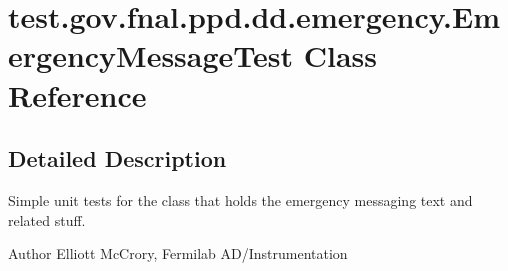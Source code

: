 \hypertarget{classtest_1_1gov_1_1fnal_1_1ppd_1_1dd_1_1emergency_1_1EmergencyMessageTest}{\section{test.\-gov.\-fnal.\-ppd.\-dd.\-emergency.\-Emergency\-Message\-Test Class Reference}
\label{classtest_1_1gov_1_1fnal_1_1ppd_1_1dd_1_1emergency_1_1EmergencyMessageTest}
}


\subsection{Detailed Description}
Simple unit tests for the class that holds the emergency messaging text and related stuff.

\begin{DoxyAuthor}{Author}
Elliott Mc\-Crory, Fermilab A\-D/\-Instrumentation 
\end{DoxyAuthor}
